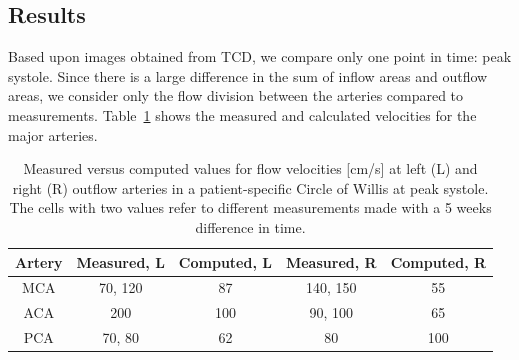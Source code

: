 

\subsection{Results}

Based upon images obtained from TCD, we compare only one point in
time: peak systole. Since there is a large difference in the sum of
inflow areas and outflow areas, we consider only the flow division
between the arteries compared to measurements.
Table~\ref{measure_vs_comp} shows the measured and calculated
velocities for the major arteries.

\begin{table}
  \begin{tabular}  {  c | c | c | c | c }
    Artery &Measured, L&Computed, L &Measured, R&Computed, R \\
    \hline
    MCA & 70, 120 		& 87  & 140, 150 	& 55	\\
    ACA & 200  		& 100  	& 90, 100 	& 65	\\
    PCA & 70, 80  		& 62 	& 80  		& 100  \\
  \end{tabular}
  \caption{Measured versus computed values for flow
    velocities [cm/s] at left (L) and right (R) outflow arteries in a patient-specific Circle of Willis at peak
    systole. The cells with two values refer to different measurements
    made with a 5 weeks difference in time.}
  \label{measure_vs_comp}
\end{table}

